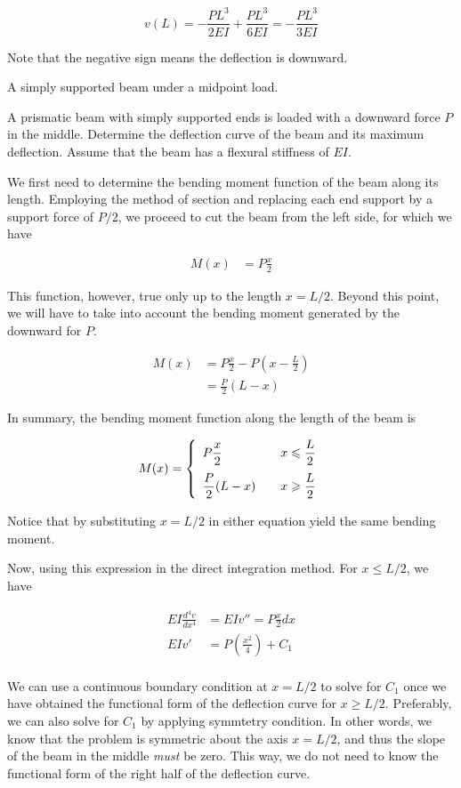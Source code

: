 \documentclass[a4paper,openany,nobib]{tufte-book}
\begin{document}
\begin{enumerate}
$$v(L) =  - \frac{PL^3}{2EI} + \frac{PL^3}{6EI} =  - \frac{PL^3}{3EI}$$

Note that the negative sign means the deflection is downward.

A simply supported beam under a midpoint load.

A prismatic beam with simply supported ends is loaded with a downward
force \(P\) in the middle. Determine the deflection curve of the beam and
its maximum deflection. Assume that the beam has a flexural stiffness of
\(EI\).


We first need to determine the bending moment function of the beam along
its length. Employing the method of section and replacing each end
support by a support force of \(P/2\), we proceed to cut the beam from the
left side, for which we have

$$\begin{aligned}
    M(x) &= P\frac{x}{2}
  \end{aligned}$$

This function, however, true only up to the length \(x = L/2\). Beyond
this point, we will have to take into account the bending moment
generated by the downward for \(P\).

$$\begin{aligned}
    M(x) &= P\frac{x}{2} - P(x-\frac{L}{2}) \\
         &= \frac{P}{2}(L-x)
  \end{aligned}$$

In summary, the bending moment function along the length of the beam is

$$M(x) = \left\{
      \begin{array}{l l l}
        P\dfrac{x}{2} & & x \leqslant \dfrac{L}{2} \\[1em]
        \dfrac{P}{2}(L-x) & & x \geqslant \dfrac{L}{2}
      \end{array} \right.$$

Notice that by substituting \(x = L/2\) in either equation yield the same
bending moment.

Now, using this expression in the direct integration method. For
\(x \leqslant L/2\), we have

$$\begin{aligned}
    EI \frac{d^4v}{dx^4} &= EIv'' = P\frac{x}{2}dx \\
    EIv' &= P (\frac{x^2}{4}) + C_1 \\
  \end{aligned}$$

We can use a continuous boundary condition at \(x = L/2\) to solve for
\(C_1\) once we have obtained the functional form of the deflection curve
for \(x \geqslant L/2\). Preferably, we can also solve for \(C_1\) by
applying symmtetry condition. In other words, we know that the problem
is symmetric about the axis \(x = L/2\), and thus the slope of the beam in
the middle \emph{must} be zero. This way, we do not need to know the
functional form of the right half of the deflection curve.


\end{enumerate}
\end{document}
